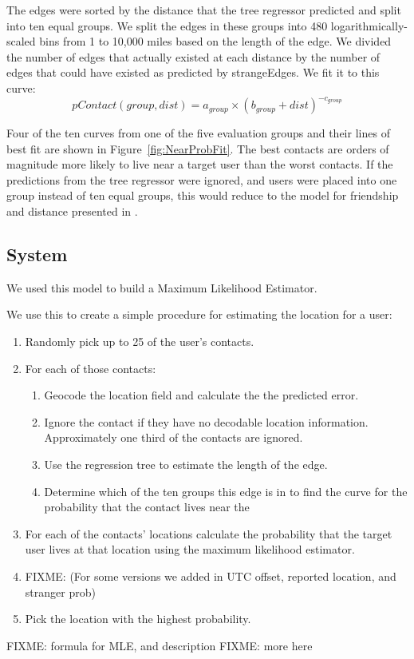 The edges were sorted by the distance that the tree regressor predicted and
split into ten equal groups.
%
We split the edges in these groups into 480 logarithmically-scaled bins from 1
to 10,000 miles based on the length of the edge.
%
We divided the number of edges that actually existed at each distance by the
number of edges that could have existed as predicted by strangeEdges.
%
We fit it to this curve:
%
\[
pContact(group, dist) = a_{group} \times (b_{group}+dist)^{-c_{group}}
\]

Four of the ten curves from one of the five evaluation groups and their lines
of best fit are shown in Figure~\ref{fig:NearProbFit}.
%
The best contacts are orders of magnitude more
likely to live near a target user than the worst contacts.
%
If the predictions from the tree regressor were ignored, and users were placed
into one group instead of ten equal groups, this would reduce to the model
for friendship and distance presented in \cite{backstrom2010find}.


\subsection{System}
We used this model to build a Maximum Likelihood Estimator.


We use this to create a simple procedure for estimating the location for a user:
\begin{enumerate}
\item Randomly pick up to 25 of the user's contacts.
\item For each of those contacts:
\begin{enumerate}
    \item Geocode the location field and calculate the the predicted error.
    \item Ignore the contact if they have no decodable location information.
    Approximately one third of the contacts are ignored.
    \item Use the regression tree to estimate the length of the edge.
    \item Determine which of the ten groups this edge is in to find the curve
        for the probability that the contact lives near the
\end{enumerate}
\item For each of the contacts' locations calculate the probability that the
target user lives at that location using the maximum likelihood estimator.
\item FIXME: (For some versions we added in UTC offset, reported location, and stranger prob)
\item Pick the location with the highest probability.
\end{enumerate}

FIXME: formula for MLE, and description
FIXME: more here

